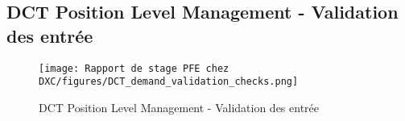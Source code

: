 \subsection{DCT Position Level Management - Validation des entrée}

\begin{figure}[H]
    \centering
    \texttt{[image: Rapport de stage PFE chez DXC/figures/DCT\_demand\_validation\_checks.png]}
    \caption{DCT Position Level Management - Validation des entrée}
\end{figure}